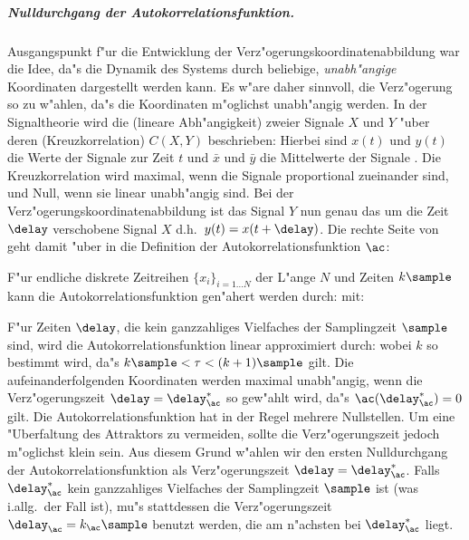 \subparagraph{Nulldurchgang der Autokorrelationsfunktion.} Ausgangspunkt f"ur die
Entwicklung der Verz"ogerungskoordinatenabbildung war die Idee, da"s die Dynamik des
Systems durch beliebige, \emph{unabh"angige} Koordinaten dargestellt werden kann. Es w"are
daher sinnvoll, die Verz"ogerung so zu w"ahlen, da"s die Koordinaten m"oglichst
unabh"angig werden. In der Signaltheorie wird die \begriff(lineare Abh"angigkeit) zweier
Signale $X$ und $Y$ "uber deren \begriff(Kreuzkorrelation) $C(X,Y)$ beschrieben:
Hierbei sind $x(t)$ und $y(t)$ die Werte der Signale zur
Zeit $t$ und $\bar x$ und $\bar y$ die Mittelwerte der Signale \footnotemark. Die
Kreuzkorrelation wird maximal, wenn die Signale proportional zueinander sind, und Null,
wenn sie linear unabh"angig sind. Bei der Verz"ogerungskoordinatenabbildung ist das Signal
$Y$ nun genau das um die Zeit $\delay$ verschobene Signal $X$ d.h.\  $y(t)=x(t+\delay)$.
Die rechte Seite von  geht damit "uber in die Definition der
Autokorrelationsfunktion $\ac$:

F"ur endliche diskrete Zeitreihen $\{x_i\}_{i=1\dots N}$ der L"ange $N$ und Zeiten
$k\sample$ kann die Autokorrelationsfunktion gen"ahert werden durch:
mit:

F"ur Zeiten $\delay$, die kein ganzzahliges Vielfaches der Samplingzeit $\sample$ sind,
wird die Autokorrelationsfunktion linear approximiert durch:
wobei $k$ so bestimmt wird, da"s $k\sample<\tau<(k+1)\sample$ gilt.  Die
aufeinanderfolgenden Koordinaten werden maximal unabh"angig, wenn die Verz"ogerungszeit
$\delay=\delay_\ac^*$ so gew"ahlt wird, da"s $\ac(\delay_\ac^*)=0$ gilt.  Die
Autokorrelationsfunktion hat in der Regel mehrere Nullstellen. Um eine "Uberfaltung des
Attraktors zu vermeiden, sollte die Verz"ogerungszeit jedoch m"oglichst klein sein.  Aus
diesem Grund w"ahlen wir den ersten Nulldurchgang der Autokorrelationsfunktion als
Verz"ogerungszeit $\delay=\delay_\ac^*$.  Falls $\delay_\ac^*$ kein ganzzahliges Vielfaches
der Samplingzeit $\sample$ ist (was i.allg.\  der Fall ist), mu"s stattdessen die Verz"ogerungszeit
$\delay_\ac=k_\ac\sample$ benutzt werden, die am n"achsten bei $\delay_\ac^*$ liegt.

